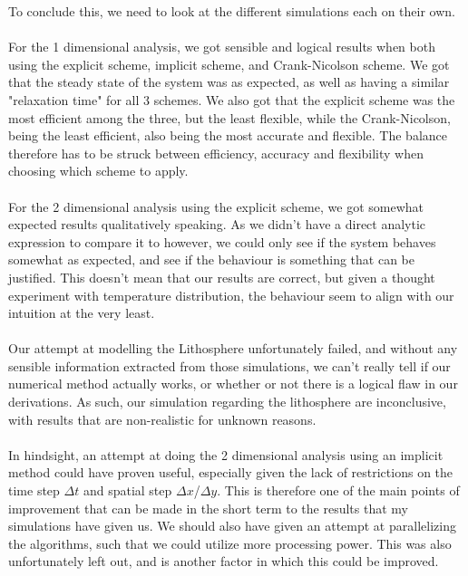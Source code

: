 \documentclass[reprint,english,notitlepage]{revtex4-1}  %
\begin{document}
To conclude this, we need to look at the different simulations each on their own.
\\
\\
For the 1 dimensional analysis, we got sensible and logical results when both using the explicit scheme, implicit scheme, and Crank-Nicolson scheme. We got that the steady state of the system was as expected, as well as having a similar "relaxation time" for all 3 schemes. We also got that the explicit scheme was the most efficient among the three, but the least flexible, while the Crank-Nicolson, being the least efficient, also being the most accurate and flexible. The balance therefore has to be struck between efficiency, accuracy and flexibility when choosing which scheme to apply.
\\
\\
For the 2 dimensional analysis using the explicit scheme, we got somewhat expected results qualitatively speaking. As we didn't have a direct analytic expression to compare it to however, we could only see if the system behaves somewhat as expected, and see if the behaviour is something that can be justified. This doesn't mean that our results are correct, but given a thought experiment with temperature distribution, the behaviour seem to align with our intuition at the very least.
\\
\\
Our attempt at modelling the Lithosphere unfortunately failed, and without any sensible information extracted from those simulations, we can't really tell if our numerical method actually works, or whether or not there is a logical flaw in our derivations. As such, our simulation regarding the lithosphere are inconclusive, with results that are non-realistic for unknown reasons.
\\
\\
In hindsight, an attempt at doing the 2 dimensional analysis using an implicit method could have proven useful, especially given the lack of restrictions on the time step $\Delta t$ and spatial step $\Delta x$/$\Delta y$. This is therefore one of the main points of improvement that can be made in the short term to the results that my simulations have given us. We should also have given an attempt at parallelizing the algorithms, such that we could utilize more processing power. This was also unfortunately left out, and is another factor in which this could be improved. 

\newpage
\end{document}
